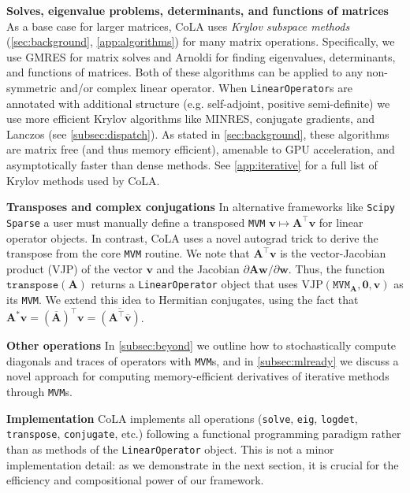 \documentclass{article}
\newcommand{\mbf}[1]{{\boldsymbol{\mathbf{#1}}}}
\renewcommand{\bm}{\mbf}
\begin{document}
\textbf{Solves, eigenvalue problems, determinants, and functions of matrices} \quad
As a base case for larger matrices, CoLA uses \emph{Krylov subspace methods} (\autoref{sec:background}, \autoref{app:algorithms}) for many matrix operations.
Specifically, we use GMRES \citep{saad1986gmres} for matrix solves
and Arnoldi \citep{arnoldi1951principle} for finding eigenvalues, determinants, and functions of matrices.
Both of these algorithms can be applied to any non-symmetric and/or complex linear operator.
When \texttt{LinearOperator}s are annotated with additional structure (e.g. self-adjoint, positive semi-definite) we use more efficient Krylov algorithms like MINRES, conjugate gradients,
and Lanczos (see \autoref{subsec:dispatch}).
As stated in \autoref{sec:background},
these algorithms are matrix free (and thus memory efficient),
amenable to GPU acceleration,
and asymptotically faster than dense methods.
See \autoref{app:iterative} for a full list of Krylov methods used by CoLA.

\textbf{Transposes and complex conjugations} \quad
In alternative frameworks like \texttt{Scipy Sparse} a user must manually define a transposed \texttt{MVM} $\bm{v} \mapsto \bm{A}^\intercal \bm{v}$ for linear operator objects.
In contrast, CoLA uses a novel autograd trick to derive the transpose from the core \texttt{MVM} routine.
We note that $\bm{A}^\intercal \bm{v}$ is the vector-Jacobian product (VJP) of the vector $\bm v$ and the Jacobian $\partial \bm{A} \bm{w} / \partial \bm w$.
Thus, the function $\texttt{transpose}(\bm{A})$ returns a \texttt{LinearOperator} object that uses $\mathrm{VJP}(\texttt{MVM}_{\bm A}, \bm 0, \bm{v})$ as its \texttt{MVM}.
We extend this idea to Hermitian conjugates, using the fact that $\bm{A}^* \bm{v} = (\overline{\bm{A}})^\intercal \bm{v} = \overline{(\bm{A}^\intercal \overline{\bm{v}})}$.

\textbf{Other operations} \quad
In \autoref{subsec:beyond} we outline how to stochastically compute diagonals and traces of operators with \texttt{MVM}s, and in \autoref{subsec:mlready} we discuss a novel approach for computing memory-efficient derivatives of iterative methods through \texttt{MVM}s.

\textbf{Implementation} \quad
CoLA implements all operations (\texttt{solve}, \texttt{eig}, \texttt{logdet}, \texttt{transpose}, \texttt{conjugate}, etc.)
following a functional programming paradigm rather than as methods of the \texttt{LinearOperator} object.
This is not a minor implementation detail:
as we demonstrate in the next section, it is crucial for the efficiency and compositional power of our framework.
\end{document}
